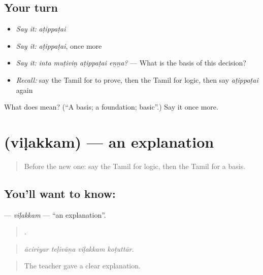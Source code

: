 \subsection*{Your turn}
\begin{itemize}
\raggedright
  \item \emph{Say it:} \emph{aṭippaṭai}
  \item \emph{Say it:} \emph{aṭippaṭai}, once more
  \item \emph{Say it:} \emph{inta muṭiviṉ aṭippaṭai eṉṉa?} — What is the basis of this decision?
  \item \emph{Recall:} say the Tamil for to prove, then the Tamil for logic, then say \emph{aṭippaṭai} again
\end{itemize}

\begin{tcolorbox}[breakable,colback=teal!4,colframe=teal!35!black,title={Before you move on}]
What does  mean? (\textquotedblleft{}A basis; a foundation; basic\textquotedblright{}.) Say it once more.
\end{tcolorbox}
\section[\texorpdfstring{\ta{விளக்கம்} (viḷakkam)}{விளக்கம் (viḷakkam)}]{ (viḷakkam) — an explanation}

\label{lesson:TA-C347-vilakkam}



\begin{quote}
Before the new one: say the Tamil for logic, then the Tamil for a basis.
\end{quote}

\subsection*{You'll want to know: }
\textbf{} — \emph{viḷakkam} — \textquotedblleft{}an explanation\textquotedblright{}.

\begin{quote}
   .
\end{quote}

\begin{quote}
\emph{āciriyar teḷivāṉa viḷakkam koṭuttār.}
\end{quote}

\begin{quote}
The teacher gave a clear explanation.
\end{quote}

